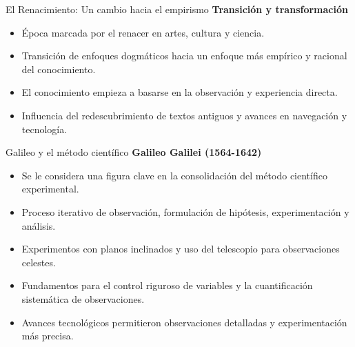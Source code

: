 ﻿\documentclass{beamer}
\begin{document}
\begin{frame}{El Renacimiento: Un cambio hacia el empirismo}
    \textbf{Transición y transformación}
    \begin{itemize}
        \item Época marcada por el renacer en artes, cultura y ciencia.
        \item Transición de enfoques dogmáticos hacia un enfoque más empírico y racional del conocimiento.
        \item El conocimiento empieza a basarse en la observación y experiencia directa.
        \item Influencia del redescubrimiento de textos antiguos y avances en navegación y tecnología.
    \end{itemize}
\end{frame}

\begin{frame}{Galileo y el método científico}
    \textbf{Galileo Galilei (1564-1642)}
    \begin{itemize}
        \item Se le considera una figura clave en la consolidación del método científico experimental.
        \item Proceso iterativo de observación, formulación de hipótesis, experimentación y análisis.
        \item Experimentos con planos inclinados y uso del telescopio para observaciones celestes.
        \item Fundamentos para el control riguroso de variables y la cuantificación sistemática de observaciones.
        \item Avances tecnológicos permitieron observaciones detalladas y experimentación más precisa.
    \end{itemize}
\end{frame}
\end{document}
